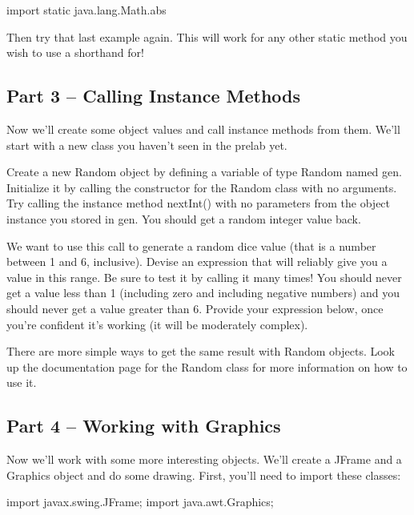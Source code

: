 \begin{code}
import static java.lang.Math.abs
\end{code}

Then try that last example again. This will work for any other static method you wish to use a shorthand for!

\initialbox


\subsection{Part 3 -- Calling Instance Methods}

Now we'll create some object values and call instance methods from them. We'll start with a new class you haven't seen in the prelab yet. 

Create a new Random object by defining a variable of type Random named gen. Initialize it by calling the constructor 
for the Random class with no arguments.  Try calling the instance method nextInt() with no parameters from the object instance you stored in gen. You should get a random integer value back. 

\begin{exer}
We want to use this call to generate a random dice value (that is a number between 1 and 6, inclusive). Devise an expression that will reliably give you a value in this range. Be sure to test it by calling it many times! You should never get a value less than 1 (including zero and including negative numbers) and you should never get a value greater than 6. Provide your expression below, once you're confident it's working (it will be moderately complex). 

\evalline

\end{exer}

There are more simple ways to get the same result with Random objects. Look up the documentation page for the Random class for more information on how to use it.

\initialbox


\subsection{Part 4 -- Working with Graphics}

Now we'll work with some more interesting objects. We'll create a JFrame and a Graphics object and do some drawing. First, you'll need to import these classes:

\begin{code}
import javax.swing.JFrame;
import java.awt.Graphics;
\end{code}

